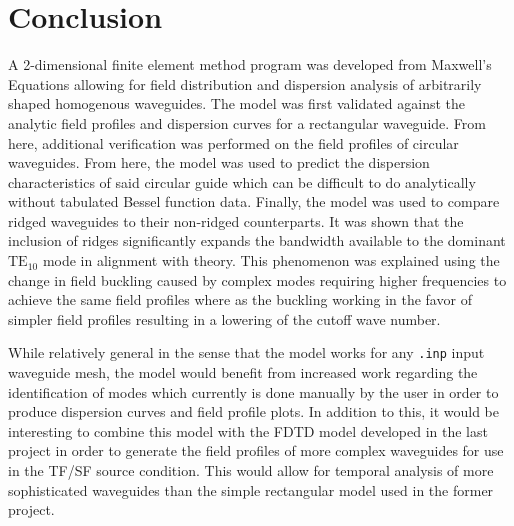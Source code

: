 \section{Conclusion}
\label{sec:conclusion}
A 2-dimensional finite element method program was developed from Maxwell's Equations allowing for field distribution and dispersion analysis of arbitrarily shaped homogenous waveguides. The model was first validated against the analytic field profiles and dispersion curves for a rectangular waveguide. From here, additional verification was performed on the field profiles of circular waveguides. From here, the model was used to predict the dispersion characteristics of said circular guide which can be difficult to do analytically without tabulated Bessel function data. Finally, the model was used to compare ridged waveguides to their non-ridged counterparts. It was shown that the inclusion of ridges significantly expands the bandwidth available to the dominant $\mathrm{TE}_{10}$ mode in alignment with theory. This phenomenon was explained using the change in field buckling caused by complex modes requiring higher frequencies to achieve the same field profiles where as the buckling working in the favor of simpler field profiles resulting in a lowering of the cutoff wave number.

While relatively general in the sense that the model works for any \verb|.inp| input waveguide mesh, the model would benefit from increased work regarding the identification of modes which currently is done manually by the user in order to produce dispersion curves and field profile plots. In addition to this, it would be interesting to combine this model with the FDTD model developed in the last project in order to generate the field profiles of more complex waveguides for use in the TF/SF source condition. This would allow for temporal analysis of more sophisticated waveguides than the simple rectangular model used in the former project. 
